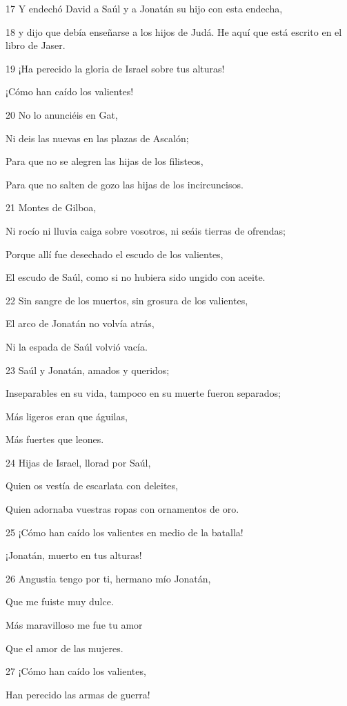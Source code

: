 \par 17 Y endechó David a Saúl y a Jonatán su hijo con esta endecha,
\par 18 y dijo que debía enseñarse a los hijos de Judá. He aquí que está escrito en el libro de Jaser.
\par 19 ¡Ha perecido la gloria de Israel sobre tus alturas!
\par ¡Cómo han caído los valientes!
\par 20 No lo anunciéis en Gat,
\par Ni deis las nuevas en las plazas de Ascalón;
\par Para que no se alegren las hijas de los filisteos,
\par Para que no salten de gozo las hijas de los incircuncisos.
\par 21 Montes de Gilboa,
\par Ni rocío ni lluvia caiga sobre vosotros, ni seáis tierras de ofrendas;
\par Porque allí fue desechado el escudo de los valientes,
\par El escudo de Saúl, como si no hubiera sido ungido con aceite.
\par 22 Sin sangre de los muertos, sin grosura de los valientes,
\par El arco de Jonatán no volvía atrás,
\par Ni la espada de Saúl volvió vacía.
\par 23 Saúl y Jonatán, amados y queridos;
\par Inseparables en su vida, tampoco en su muerte fueron separados;
\par Más ligeros eran que águilas,
\par Más fuertes que leones.
\par 24 Hijas de Israel, llorad por Saúl,
\par Quien os vestía de escarlata con deleites,
\par Quien adornaba vuestras ropas con ornamentos de oro.
\par 25 ¡Cómo han caído los valientes en medio de la batalla!
\par ¡Jonatán, muerto en tus alturas!
\par 26 Angustia tengo por ti, hermano mío Jonatán,
\par Que me fuiste muy dulce.
\par Más maravilloso me fue tu amor
\par Que el amor de las mujeres.
\par 27 ¡Cómo han caído los valientes,
\par Han perecido las armas de guerra!

